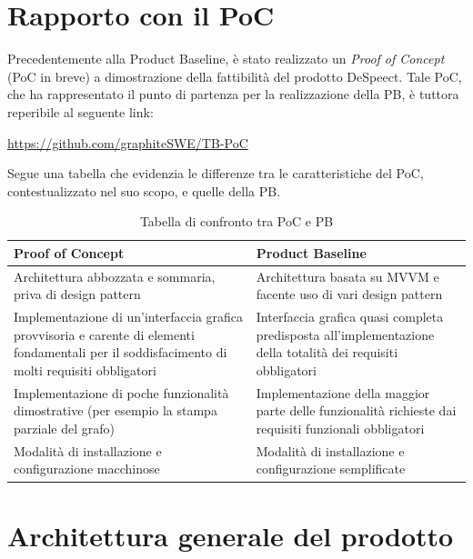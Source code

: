 \documentclass[openany,12pt,a4paper]{report}
\begin{document}
	\chapter{Rapporto con il PoC}
	Precedentemente alla Product Baseline, è stato realizzato un \textit{Proof of Concept} (PoC in breve) a dimostrazione della fattibilità del prodotto DeSpeect. Tale PoC, che ha rappresentato il punto di partenza per la realizzazione della PB, è tuttora reperibile al seguente link:
	\begin{center}
		\url{https://github.com/graphiteSWE/TB-PoC}
	\end{center}

	\noindent Segue una tabella che evidenzia le differenze tra le caratteristiche del PoC, contestualizzato nel suo scopo, e quelle della PB. \\
	
	\begin{longtable}{|p{70mm}|p{70mm}|}
		\caption {Tabella di confronto tra PoC e PB} \label{tab:Tabella di confronto tra PoC e PB} \\
		\hline
		\textbf{Proof of Concept} & \textbf{Product Baseline} \\
		
		\hline Architettura abbozzata e sommaria, priva di design pattern 
		&
		Architettura basata su MVVM e facente uso di vari design pattern \\ 
		
		\hline Implementazione di un'interfaccia grafica provvisoria e carente di elementi fondamentali per il soddisfacimento di molti requisiti obbligatori 
		&
		Interfaccia grafica quasi completa predisposta all'implementazione della totalità dei requisiti obbligatori \\ 
		
		\hline Implementazione di poche funzionalità dimostrative (per esempio la stampa parziale del grafo)
		&
		Implementazione della maggior parte delle funzionalità richieste dai requisiti funzionali obbligatori \\ 
		
		\hline Modalità di installazione e configurazione macchinose
		&
		Modalità di installazione e configurazione semplificate \\ 
		\hline
	\end{longtable}

	\chapter{Architettura generale del prodotto}
	
\end{document}
